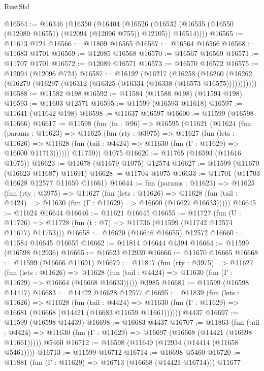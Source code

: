 \begin{lexlean}{RustStd}
\begin{coremodule}
@16564 := @16346
    (@16350
      (@16404
        (@16526 (@16532 (@16535 (@16550 (@12089 @16551) (@12094 (@12096 @755)) @12105)) @16514))))
@16565 := @11613 @724
@16566 := @11809 @16565
@16567 := @16564 @16566
@16568 := @11683 @1701
@16569 := @12085 @16568
@16570 := @16567 @16569
@16571 := @11707 @1701
@16572 := @12089 @16571
@16573 := @16570 @16572
@16575 := @12094 (@12096 @724)
@16587 := @16192
    (@16217
      (@16258
        (@16260 (@16262 (@16279 (@16297 (@16312 (@16325 (@16334 (@16338 (@16573 @16575)))))))))))
@16588 := @11582 @198
@16592 := @11584 (@11588 @198) (@11594 @198)
@16593 := @11603 @12571
@16595 := @11599 (@16593 @11618)
@16597 := @11641 (@11642 @198)
@16598 := @11637 @16597
@16600 := @11599 (@16598 @11666)
@16617 := @11598
    (fun (fn : @96) =>
    @16595
      (@11621
        (@11624
          (fun (params : @11623) =>
          @11625
            (fun (rty : @3975) =>
            @11627
              (fun (lets : @11626) =>
              @11628 (fun (tail : @4424) => @11630 (fun (Γ : @11629) => @16600 @11713))))))
        @11759))
    @1075
@16620 := @11765 (@16593 (@11616 @1075))
@16623 := @11678 (@11679 @1075) @12574
@16627 := @11599 (@11670 (@16623 @11687) @11691)
@16628 := @11704 @1075
@16633 := @11701 (@11703 @16628 @12577 @11659 @11661)
@16644 := fun (params : @11623) =>
  @11625
    (fun (rty : @3975) =>
    @11627
      (fun (lets : @11626) =>
      @11628 (fun (tail : @4424) => @11630 (fun (Γ : @11629) => @16600 (@16627 @16633)))))
@16645 := @11624 @16644
@16646 := @11621 @16645
@16655 := @11727
    (fun (U : @11726) => @11728 (fun (t : @7) => @11736 (@11599 (@11742 @12574 @11617) @11753)))
@16658 := @16620 (@16646 @16655) @12572
@16660 := @11584 @16645 @16655
@16662 := @11814 @16644 @4394
@16664 := @11599 (@16598 @12936)
@16665 := @16623 @12939
@16666 := @11670 @16665
@16668 := @11599 (@16666 @11691)
@16679 := @11817
    (fun (rty : @3975) =>
    @11627
      (fun (lets : @11626) =>
      @11628 (fun (tail : @4424) => @11630 (fun (Γ : @11629) => @16664 (@16668 @16633)))))
    @3985
@16681 := @11599 (@16598 @14417)
@16683 := @14422 @16628 @12577
@16695 := @11839
    (fun (lets : @11626) =>
    @11628
      (fun (tail : @4424) =>
      @11630 (fun (Γ : @11629) => @16681 (@16668 (@14421 (@16683 @11659 @11661))))))
    @4437
@16697 := @11599 (@16598 @14439)
@16698 := @16683 @4437
@16707 := @11863
    (fun (tail : @4424) => @11630 (fun (Γ : @11629) => @16697 (@16668 (@14421 (@16698 @11661)))))
    @5460
@16712 := @16598 (@11649 (@12934 (@14414 (@11658 @5461))))
@16713 := @11599 @16712
@16714 := @16698 @5460
@16720 := @11881 (fun (Γ : @11629) => @16713 (@16668 (@14421 @16714))) @11677

\end{coremodule}
\end{lexlean}
